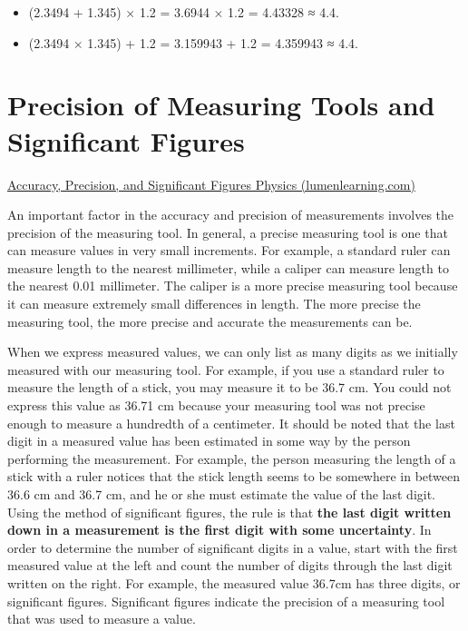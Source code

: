 \documentclass[
  letterpaper,
]{scrbook}
\providecommand{\tightlist}{%
  \setlength{\itemsep}{0pt}\setlength{\parskip}{0pt}}\usepackage{longtable,booktabs,array}
\begin{document}
\begin{itemize}
\tightlist
\item
  (2.3494 + 1.345) × 1.2 = 3.6944 × 1.2 = 4.43328 ≈ 4.4.
\item
  (2.3494 × 1.345) + 1.2 = 3.159943 + 1.2 = 4.359943 ≈ 4.4.
\end{itemize}

\hypertarget{precision-of-measuring-tools-and-significant-figures}{%
\section{Precision of Measuring Tools and Significant
Figures}\label{precision-of-measuring-tools-and-significant-figures}}

\href{https://courses.lumenlearning.com/atd-austincc-physics1/chapter/1-3-accuracy-precision-and-significant-figures/}{Accuracy,
Precision, and Significant Figures \textbar{} Physics
(lumenlearning.com)}

An important factor in the accuracy and precision of measurements
involves the precision of the measuring tool. In general, a precise
measuring tool is one that can measure values in very small increments.
For example, a standard ruler can measure length to the nearest
millimeter, while a caliper can measure length to the nearest 0.01
millimeter. The caliper is a more precise measuring tool because it can
measure extremely small differences in length. The more precise the
measuring tool, the more precise and accurate the measurements can be.

When we express measured values, we can only list as many digits as we
initially measured with our measuring tool. For example, if you use a
standard ruler to measure the length of a stick, you may measure it to
be 36.7 cm. You could not express this value as 36.71 cm because your
measuring tool was not precise enough to measure a hundredth of a
centimeter. It should be noted that the last digit in a measured value
has been estimated in some way by the person performing the measurement.
For example, the person measuring the length of a stick with a ruler
notices that the stick length seems to be somewhere in between 36.6 cm
and 36.7 cm, and he or she must estimate the value of the last digit.
Using the method of significant figures, the rule is that \textbf{the
last digit written down in a measurement is the first digit with some
uncertainty}. In order to determine the number of significant digits in
a value, start with the first measured value at the left and count the
number of digits through the last digit written on the right. For
example, the measured value 36.7cm has three digits, or significant
figures. Significant figures indicate the precision of a measuring tool
that was used to measure a value.
\end{document}
